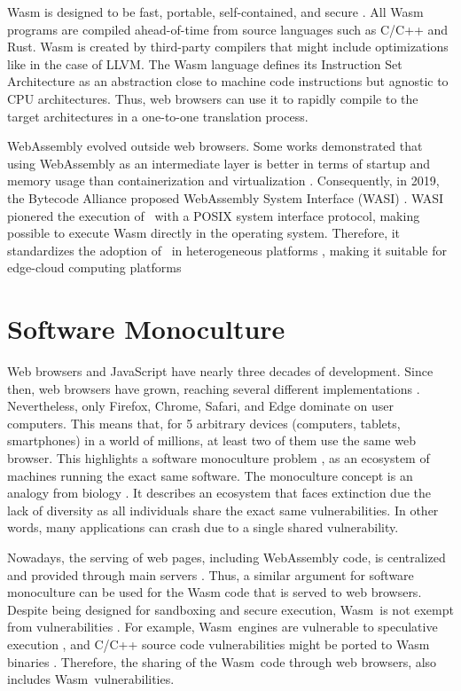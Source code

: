 Wasm is designed to be fast, portable, self-contained, and secure \cite{Haas_2017}.
All Wasm programs are compiled ahead-of-time from source languages such as C/C++ and Rust.
Wasm is created by third-party compilers that might include optimizations like in the case of LLVM.  
The Wasm language defines its Instruction Set Architecture \cite{wasm_spec} as an abstraction close to machine code instructions but agnostic to CPU architectures. Thus,  web browsers can use it to rapidly compile to the target architectures in a one-to-one translation process.

WebAssembly evolved outside web browsers.
Some works demonstrated that using WebAssembly as an intermediate layer is better in terms of startup and memory usage than containerization and virtualization \cite{pMendkiServerless, 1244493Jacobsson}. 
Consequently, in 2019, the Bytecode Alliance \cite{bytecodealliance} proposed WebAssembly System Interface (WASI) \cite{WASI}. 
WASI pionered the execution of \wasm\ with a POSIX system interface protocol, making possible to execute Wasm directly in the operating system. 
Therefore, it standardizes the adoption of \wasm\ in heterogeneous platforms \cite{bryant2020webassembly}, making it suitable for edge-cloud computing platforms \cite{9640153, wen2020wasmachine}

\section{Software Monoculture}
Web browsers and JavaScript have nearly three decades of development.
Since then, web browsers have grown, reaching several different implementations \cite{grosskurth2005reference, GARCES2021111004}. 
Nevertheless, only Firefox, Chrome, Safari, and Edge dominate on user computers.
This means that, for 5 arbitrary devices (computers, tablets, smartphones) in a world of millions, at least two of them use the same web browser.
This highlights a software monoculture problem \cite{goth2003addressing}, as an ecosystem of machines running the exact same software. 
The monoculture concept is an analogy from biology \cite{lala2009monoculture}. 
It describes an ecosystem that faces extinction due the lack of diversity as all individuals share the exact same vulnerabilities.
In other words, many applications can crash due to a single shared vulnerability.


\renewcommand{\wasm}{Wasm}

Nowadays, the serving of web pages, including WebAssembly code, is centralized and provided through main servers \cite{STRAC}.
Thus, a similar argument for software monoculture can be used for the Wasm code that is served to web browsers. 
Despite being designed for sandboxing and secure execution, \wasm\ is not exempt from vulnerabilities \cite{WebAssemblySecurity}.
For example, \wasm\ engines are vulnerable to speculative execution \cite{Narayan2021Swivel}, and C/C++ source code vulnerabilities might be ported to Wasm binaries \cite{DeRoover2022}.  
Therefore, the sharing of the \wasm\ code through web browsers, also includes \wasm\ vulnerabilities.


